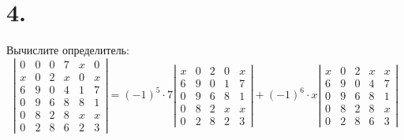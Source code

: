 \documentclass[a4paper,12pt]{article}
\begin{document}
\newpage
\section*{4.}
Вычислите определитель:
\[
\left|\begin{matrix}
0 & 0 & 0 & 7 & x & 0 \\
x & 0 & 2 & x & 0 & x \\
6 & 9 & 0 & 4 & 1 & 7 \\
0 & 9 & 6 & 8 & 8 & 1 \\
0 & 8 & 2 & 8 & x & x \\
0 & 2 & 8 & 6 & 2 & 3
\end{matrix}\right| 
=
(-1)^5 \cdot 7 
\left|\begin{matrix}
x & 0 & 2 & 0 & x \\
6 & 9 & 0 & 1 & 7 \\
0 & 9 & 6 & 8 & 1 \\
0 & 8 & 2 & x & x \\
0 & 2 & 8 & 2 & 3
\end{matrix}\right|
+
(-1)^6 \cdot x 
\left|\begin{matrix}
x & 0 & 2 & x & x \\
6 & 9 & 0 & 4 & 7 \\
0 & 9 & 6 & 8 & 1 \\
0 & 8 & 2 & 8 & x \\
0 & 2 & 8 & 6 & 3
\end{matrix}\right|
\]
\end{document}
